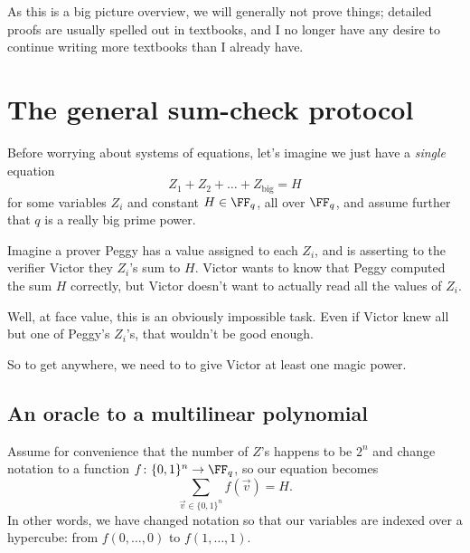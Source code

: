 \documentclass[11pt]{scrreprt}
\begin{document}
As this is a big picture overview, we will generally not prove things;
detailed proofs are usually spelled out in textbooks,
and I no longer have any desire to continue writing more textbooks than I already have.

\section{The general sum-check protocol}
Before worrying about systems of equations, let's imagine we just have a
\emph{single} equation
\[ Z_1 + Z_2 + \dots + Z_{\text{big}} = H \]
for some variables $Z_i$ and constant $H \in \FF_q$, all over $\FF_q$,
and assume further that $q$ is a really big prime power.

Imagine a prover Peggy has a value assigned to each $Z_i$,
and is asserting to the verifier Victor they $Z_i$'s sum to $H$.
Victor wants to know that Peggy computed the sum $H$ correctly,
but Victor doesn't want to actually read all the values of $Z_i$.

Well, at face value, this is an obviously impossible task.
Even if Victor knew all but one of Peggy's $Z_i$'s, that wouldn't be good enough.

So to get anywhere, we need to to give Victor at least one magic power.

\subsection{An oracle to a multilinear polynomial}
Assume for convenience that the number of $Z$'s happens to be $2^n$
and change notation to a function $f \colon \{0,1\}^n \to \FF_q$, so our equation becomes
\[ \sum_{\vec v \in \{0,1\}^n} f(\vec v) = H. \]
In other words, we have changed notation so that our variables are indexed over a
hypercube: from $f(0, \dots, 0)$ to $f(1, \dots, 1)$.
\end{document}

